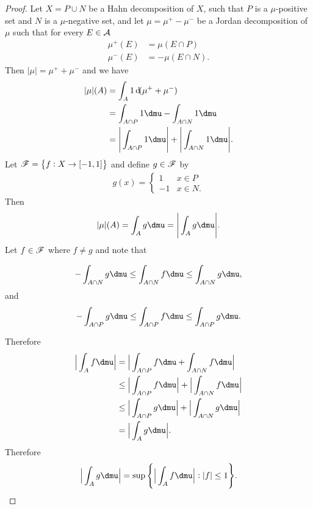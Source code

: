 \begin{proof}
  Let $X = P \cup N$ be a Hahn decomposition of $X$, such that $P$ is a $\mu$-positive set and $N$ is
  a $\mu$-negative set, and let $\mu = \mu^+ - \mu^-$ be a Jordan decomposition of $\mu$ such that for
  every $E \in \mathcal A$
  \begin{align*}
    \mu^+(E) &= \mu(E \cap P) \\
    \mu^-(E) &= -\mu(E \cap N).
  \end{align*}
  Then $|\mu| = \mu^+ + \mu^-$ and we have
  \begin{align*}
    |\mu|(A)
    &= \int_A 1 \d(\mu^+ + \mu^-) \\
    &=\int_{A\cap P} 1 \dmu - \int_{A \cap N} 1 \dmu \\
    &=\Bigg|\int_{A\cap P} 1 \dmu\Bigg| + \Bigg|\int_{A \cap N} 1 \dmu\Bigg|.
  \end{align*}
  Let $\mathscr F = \big\{f: X \to [-1, 1]\big\}$ and define $g \in \mathscr F$ by
  \begin{align*}
    g(x) =
    \begin{cases}
      1  & x \in P \\
      -1 & x \in N.
    \end{cases}
  \end{align*}
  Then
  \begin{align*}
    |\mu|(A) = \int_A g \dmu = \Bigg|\int_A g \dmu\Bigg|.
  \end{align*}
  Let $f \in \mathscr F$ where $f \neq g$ and note that

  \begin{align*}
    -\int_{A \cap N} g \dmu \leq \int_{A \cap N} f \dmu \leq \int_{A \cap N} g \dmu,
  \end{align*}
  and
  \begin{align*}
    -\int_{A \cap P} g \dmu \leq \int_{A \cap P} f \dmu \leq \int_{A \cap P} g \dmu.
  \end{align*}

  Therefore
  \begin{align*}
    \Big|\int_A f \dmu\Big|
    &= \Big|\int_{A \cap P} f \dmu + \int_{A \cap N} f \dmu\Big| \\
    &\leq \Big|\int_{A \cap P} f \dmu\Big| + \Big|\int_{A \cap N} f \dmu\Big| \\
    &\leq \Big|\int_{A \cap P} g \dmu\Big| + \Big|\int_{A \cap N} g \dmu\Big| \\
    &= \Big|\int_{A} g \dmu\Big|.
  \end{align*}
  Therefore
  \begin{align*}
    \Big|\int_{A} g \dmu\Big| = \sup\Bigg\{ \Big|\int_A f \dmu\Big| : |f| \leq 1 \Bigg\}.
  \end{align*}
\end{proof}


